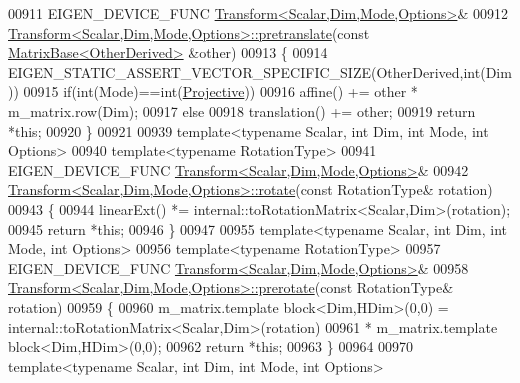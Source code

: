 \begin{DoxyCode}
00911 EIGEN\_DEVICE\_FUNC \hyperlink{group___geometry___module_class_eigen_1_1_transform}{Transform<Scalar,Dim,Mode,Options>}&
00912 \hyperlink{group___geometry___module_class_eigen_1_1_transform}{Transform<Scalar,Dim,Mode,Options>::pretranslate}(\textcolor{keyword}{const} 
      \hyperlink{group___core___module_class_eigen_1_1_matrix_base}{MatrixBase<OtherDerived>} &other)
00913 \{
00914   EIGEN\_STATIC\_ASSERT\_VECTOR\_SPECIFIC\_SIZE(OtherDerived,\textcolor{keywordtype}{int}(Dim))
00915   \textcolor{keywordflow}{if}(\textcolor{keywordtype}{int}(Mode)==\textcolor{keywordtype}{int}(\hyperlink{group__enums_ggaee59a86102f150923b0cac6d4ff05107aead6a2de12a17aaa4f5c523215dfccad}{Projective}))
00916     affine() += other * m\_matrix.row(Dim);
00917   \textcolor{keywordflow}{else}
00918     translation() += other;
00919   \textcolor{keywordflow}{return} *\textcolor{keyword}{this};
00920 \}
00921 
00939 \textcolor{keyword}{template}<\textcolor{keyword}{typename} Scalar, \textcolor{keywordtype}{int} Dim, \textcolor{keywordtype}{int} Mode, \textcolor{keywordtype}{int} Options>
00940 \textcolor{keyword}{template}<\textcolor{keyword}{typename} RotationType>
00941 EIGEN\_DEVICE\_FUNC \hyperlink{group___geometry___module_class_eigen_1_1_transform}{Transform<Scalar,Dim,Mode,Options>}&
00942 \hyperlink{group___geometry___module_class_eigen_1_1_transform}{Transform<Scalar,Dim,Mode,Options>::rotate}(\textcolor{keyword}{const} RotationType& 
      rotation)
00943 \{
00944   linearExt() *= internal::toRotationMatrix<Scalar,Dim>(rotation);
00945   \textcolor{keywordflow}{return} *\textcolor{keyword}{this};
00946 \}
00947 
00955 \textcolor{keyword}{template}<\textcolor{keyword}{typename} Scalar, \textcolor{keywordtype}{int} Dim, \textcolor{keywordtype}{int} Mode, \textcolor{keywordtype}{int} Options>
00956 \textcolor{keyword}{template}<\textcolor{keyword}{typename} RotationType>
00957 EIGEN\_DEVICE\_FUNC \hyperlink{group___geometry___module_class_eigen_1_1_transform}{Transform<Scalar,Dim,Mode,Options>}&
00958 \hyperlink{group___geometry___module_class_eigen_1_1_transform}{Transform<Scalar,Dim,Mode,Options>::prerotate}(\textcolor{keyword}{const} 
      RotationType& rotation)
00959 \{
00960   m\_matrix.template block<Dim,HDim>(0,0) = internal::toRotationMatrix<Scalar,Dim>(rotation)
00961                                          * m\_matrix.template block<Dim,HDim>(0,0);
00962   \textcolor{keywordflow}{return} *\textcolor{keyword}{this};
00963 \}
00964 
00970 \textcolor{keyword}{template}<\textcolor{keyword}{typename} Scalar, \textcolor{keywordtype}{int} Dim, \textcolor{keywordtype}{int} Mode, \textcolor{keywordtype}{int} Options>

\end{DoxyCode}
